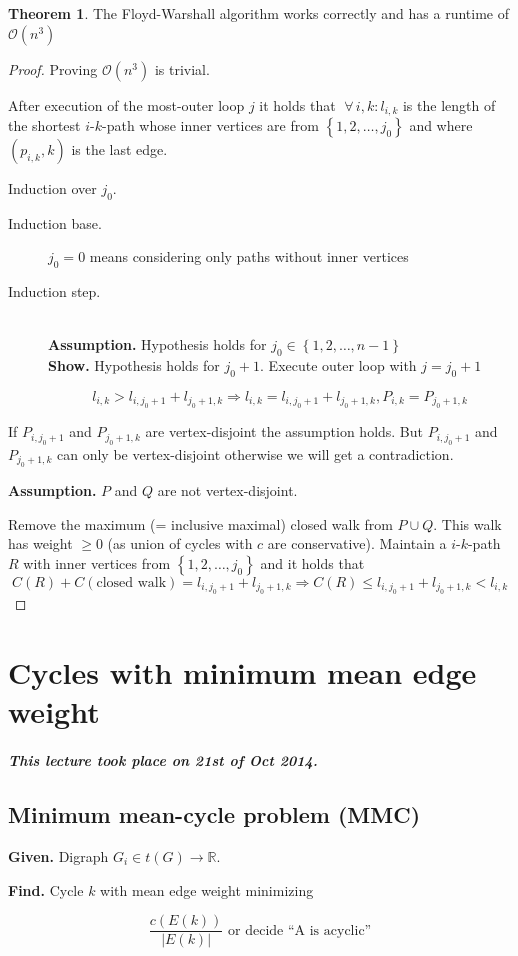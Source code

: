 \documentclass[a4paper]{article}
\theoremstyle{definition}
\newtheorem{theorem}{Theorem}
\newcommand{\set}[1]{\left\{#1\right\}}
\newcommand{\given}[1]{\textbf{Given.} #1\par}
\newcommand{\find}[1]{\textbf{Find.} #1\par}
\newcommand{\dateref}[1]{\paragraph{\textit{This lecture took place on #1.}}}
\newcommand{\gath}[2]{$#1$-$#2$-path} %
\newcommand{\fall}{\;\forall\,}
\begin{document}
\begin{theorem}\label{satz-3.6}
  The Floyd-Warshall algorithm works correctly and has a runtime of $\mathcal{O}(n^3)$
\end{theorem}

\begin{proof}
Proving $\mathcal{O}(n^3)$ is trivial.

After execution of the most-outer loop $j$ it holds that $\fall i,k: l_{i,k}$ is the length of the shortest \gath ik whose inner vertices are from $\set{1, 2, \ldots, j_0}$ and where $(p_{i,k}, k)$ is the last edge.

Induction over $j_0$.

\begin{description}
  \item[Induction base.] $j_0 = 0$ means considering only paths without inner vertices
  \item[Induction step.] \hfill{} \\
    \textbf{Assumption.} Hypothesis holds for $j_0 \in \set{1, 2, \ldots, n-1}$ \\
    \textbf{Show.} Hypothesis holds for $j_0 + 1$.
    Execute outer loop with $j = j_0 + 1$

    \[
      l_{i,k} > l_{i,j_0+1} + l_{j_0+1,k} \Rightarrow
        l_{i,k} = l_{i,j_0+1} + l_{j_0+1,k}, P_{i,k} = P_{j_0+1,k}
    \]
\end{description}

If $P_{i,j_0+1}$ and $P_{j_0+1,k}$ are vertex-disjoint the assumption holds. But $P_{i,j_0+1}$ and $P_{j_0+1,k}$ can only be vertex-disjoint otherwise we will get a contradiction.

\textbf{Assumption.}
 $P$ and $Q$ are not vertex-disjoint.

Remove the maximum (= inclusive maximal) closed walk from $P \cup Q$. This walk has weight $\geq 0$ (as union of cycles with $c$ are conservative). Maintain a \gath ik $R$ with inner vertices from $\set{1, 2, \ldots, j_0}$ and it holds that
\[
  C(R) + C(\text{closed walk}) = l_{i,j_0+1} + l_{j_0+1,k}
    \Rightarrow C(R) \leq l_{i,j_0+1} + l_{j_0+1,k} < l_{i,k}
\]
\end{proof}

\section{Cycles with minimum mean edge weight}
%
\dateref{21st of Oct 2014}
%
\subsection{Minimum mean-cycle problem (MMC)}
%
\given{Digraph $G_i \in t(G) \rightarrow \mathbb{R}$.}
\find{Cycle $k$ with mean edge weight minimizing}
\[
  \frac{c(E(k))}{|E(k)|} \text{ or decide ``A is acyclic''}
\]
\end{document}
